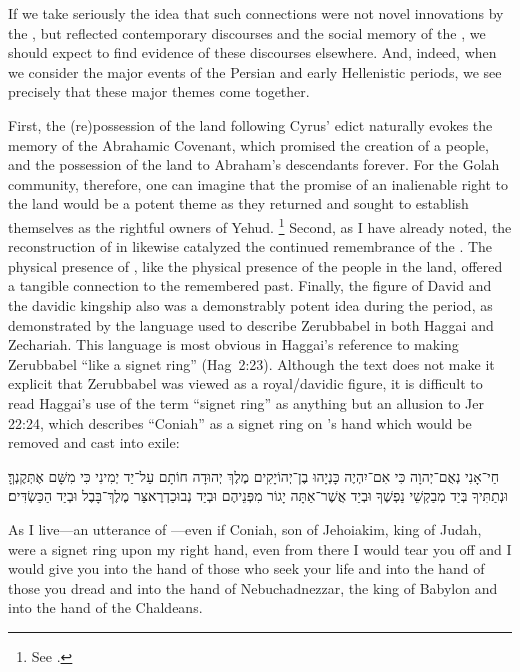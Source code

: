 If we take seriously the idea that such connections were not novel innovations by the \chronicler, but reflected contemporary discourses and the social memory of the \chronicler, we should expect to find evidence of these discourses elsewhere. And, indeed, when we consider the major events of the Persian and early Hellenistic periods, we see precisely that these major themes come together.

First, the (re)possession of the land following Cyrus' edict naturally evokes the memory of the Abrahamic Covenant, which promised the creation of a people, and the possession of the land to Abraham's descendants forever. For the Golah community, therefore, one can imagine that the promise of an inalienable right to the land would be a potent theme as they returned and sought to establish themselves as the rightful owners of Yehud.%
    \footnote{See \cite{benzvi_bautch-knoppers2015}.}
Second, as I have already noted, the reconstruction of \thetemple in  likewise catalyzed the continued remembrance of the \firsttemple. The physical presence of \thetemple, like the physical presence of the people in the land, offered a tangible connection to the remembered past. Finally, the figure of David and the davidic kingship also was a demonstrably potent idea during the \secondtemple period, as demonstrated by the language used to describe Zerubbabel in both Haggai and Zechariah. This language is most obvious in Haggai's reference to \yahweh making Zerubbabel ``like a signet ring'' (Hag~2:23). Although the text does not make it explicit that Zerubbabel was viewed as a royal/davidic figure, it is difficult to read Haggai's use of the term ``signet ring'' as anything but an allusion to Jer 22:24, which describes ``Coniah'' as a signet ring on \yahweh's hand which would be removed and cast into exile:
\begin{hebrewtext}
    חַי־אָנִי נְאֻם־יְהוָה כִּי אִם־יִהְיֶה כָּנְיָהוּ בֶן־יְהוֹיָקִים מֶלֶךְ יְהוּדָה חוֹתָם עַל־יַד יְמִינִי כִּי מִשָּׁם אֶתְּקֶנְךָּ׃ 
    וּנְתַתִּיךָ בְּיַד מְבַקְשֵׁי נַפְשֶׁךָ וּבְיַד אֲשֶׁר־אַתָּה יָגוֹר מִפְּנֵיהֶם וּבְיַד נְבוּכַדְרֶאצַּר מֶלֶךְ־בָּבֶל וּבְיַד הַכַּשְׂדִּים׃
\end{hebrewtext}
\begin{translation}
    As I live---an utterance of \yahweh---even if Coniah, son of Jehoiakim, king of Judah, were a signet ring upon my right hand, even from there I would tear you off
    and I would give you into the hand of those who seek your life and into the hand of those you dread and into the hand of Nebuchadnezzar, the king of Babylon and into the hand of the Chaldeans.
\end{translation}

